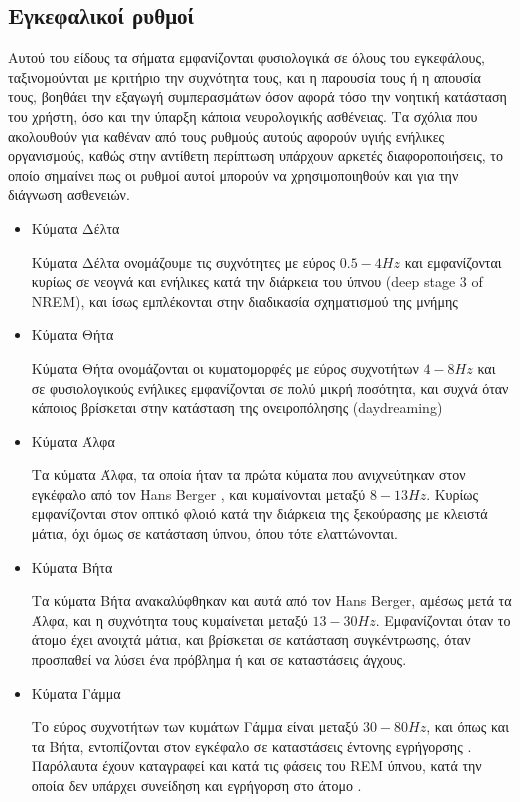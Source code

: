 \documentclass[11pt,a4paper,english,greek,twoside]{../Thesis}
\begin{document}
  \subsection{Εγκεφαλικοί ρυθμοί}
    \par Αυτού του είδους τα σήματα εμφανίζονται φυσιολογικά σε όλους του εγκεφάλους, ταξινομούνται με κριτήριο την συχνότητα τους, και η παρουσία τους ή η απουσία τους, βοηθάει την εξαγωγή συμπερασμάτων όσον αφορά τόσο την νοητική κατάσταση του χρήστη, όσο και την ύπαρξη κάποια νευρολογικής ασθένειας. Τα σχόλια που ακολουθούν για καθέναν από τους ρυθμούς αυτούς αφορούν υγιής ενήλικες οργανισμούς, καθώς στην αντίθετη περίπτωση υπάρχουν αρκετές διαφοροποιήσεις, το οποίο σημαίνει πως οι ρυθμοί αυτοί μπορούν να χρησιμοποιηθούν και για την διάγνωση ασθενειών. 
    \begin{itemize}
        \item {Κύματα Δέλτα}
        \par Κύματα Δέλτα ονομάζουμε τις συχνότητες με εύρος $0.5 - 4 Hz$ και εμφανίζονται κυρίως σε νεογνά και ενήλικες κατά την διάρκεια του ύπνου (deep stage 3 of NREM), και ίσως εμπλέκονται στην διαδικασία σχηματισμού της μνήμης \cite{Maquet2001-cs}
        \item {Κύματα Θήτα}
        \par Κύματα Θήτα ονομάζονται οι κυματομορφές με εύρος συχνοτήτων $4 - 8Hz$ και σε φυσιολογικούς ενήλικες εμφανίζονται σε πολύ μικρή ποσότητα, και συχνά όταν κάποιος βρίσκεται στην κατάσταση της ονειροπόλησης (daydreaming)
        \item {Κύματα Άλφα}
        \label{item:alpha}
        \par Τα κύματα Άλφα, τα οποία ήταν τα πρώτα κύματα που ανιχνεύτηκαν στον εγκέφαλο από τον Hans Berger \cite{Berger1933-pg}, και κυμαίνονται μεταξύ $8 - 13Hz$. Κυρίως εμφανίζονται στον οπτικό φλοιό κατά την διάρκεια της ξεκούρασης με κλειστά μάτια, όχι όμως σε κατάσταση ύπνου, όπου τότε ελαττώνονται. 
        \item {Κύματα Βήτα}
        \par Τα κύματα Βήτα ανακαλύφθηκαν και αυτά από τον Hans Berger, αμέσως μετά τα Άλφα, και η συχνότητα τους κυμαίνεται μεταξύ $13 - 30Hz$. Εμφανίζονται όταν το άτομο έχει ανοιχτά μάτια, και βρίσκεται σε κατάσταση συγκέντρωσης, όταν προσπαθεί να λύσει ένα πρόβλημα ή και σε καταστάσεις άγχους.
        \item{Κύματα Γάμμα}
        \par Το εύρος συχνοτήτων των κυμάτων Γάμμα είναι μεταξύ $30 - 80Hz$, και όπως και τα Βήτα, εντοπίζονται στον εγκέφαλο σε καταστάσεις έντονης εγρήγορσης \cite{Bressler1990-im}. Παρόλαυτα έχουν καταγραφεί και κατά τις φάσεις του REM ύπνου, κατά την οποία δεν υπάρχει συνείδηση και εγρήγορση στο άτομο \cite{Steriade1996-pg}.
    \end{itemize}
\end{document}
